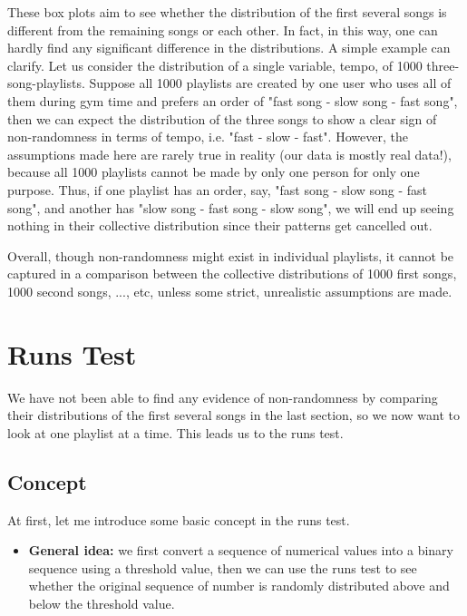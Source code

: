 \documentclass[12pt]{article}
\theoremstyle{plain}
\theoremstyle{definition}
\theoremstyle{remark}
\begin{document}
These box plots aim to see whether the distribution of the first several songs is different from the remaining songs or each other. In fact, in this way, one can hardly find any significant difference in the distributions. A simple example can clarify. Let us consider the distribution of a single variable, tempo, of 1000 three-song-playlists. Suppose all 1000 playlists are created by one user who uses all of them during gym time and prefers an order of "fast song - slow song - fast song", then we can expect the distribution of the three songs to show a clear sign of non-randomness in terms of tempo, i.e. "fast - slow - fast". However, the assumptions made here are rarely true in reality (our data is mostly real data!), because all 1000 playlists cannot be made by only one person for only one purpose. Thus, if one playlist has an order, say, "fast song - slow song - fast song", and another has "slow song - fast song - slow song", we will end up seeing nothing in their collective distribution since their patterns get cancelled out. 

Overall, though non-randomness might exist in individual playlists, it cannot be captured in a comparison between the collective distributions of 1000 first songs, 1000 second songs, ..., etc, unless some strict, unrealistic assumptions are made. 

\newpage


\section{Runs Test}
We have not been able to find any evidence of non-randomness by comparing their distributions of the first several songs in the last section, so we now want to look at one playlist at a time. This leads us to the runs test\cite{3.5}.

\subsection{Concept}
 At first, let me introduce some basic concept in the runs test.

\begin{itemize}
    \item \textbf{General idea:} we first convert a sequence of numerical values into a binary sequence using a threshold value, then we can use the runs test to see whether the original sequence of number is randomly distributed above and below the threshold value.
\end{itemize}
\end{document}
